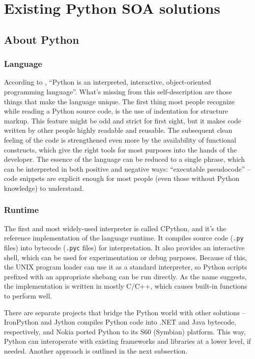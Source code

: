 \chapter{Existing Python SOA solutions}

\section{About Python}

\subsection{Language}

According to \cite{python-faq}, ``Python is an interpreted, interactive, object-oriented programming language''. What's missing from this self-description are those things that make the language unique. The first thing most people recognize while reading a Python source code, is the use of indentation for structure markup. This feature might be odd and strict for first sight, but it makes code written by other people highly readable and reusable. The subsequent clean feeling of the code is strengthened even more by the availability of functional constructs, which give the right tools for most purposes into the hands of the developer. The essence of the language can be reduced to a single phrase, which can be interpreted in both positive and negative ways: ``executable pseudocode'' -- code snippets are explicit enough for most people (even those without Python knowledge) to understand.

\subsection{Runtime}

The first and most widely-used interpreter is called CPython, and it's the reference implementation of the language runtime. It compiles source code (\verb|.py| files) into bytecode (\verb|.pyc| files) for interpretation. It also provides an interactive shell, which can be used for experimentation or debug purposes. Because of this, the UNIX program loader can use it as a standard interpreter, so Python scripts prefixed with an appropriate shebang can be run directly. As the name suggests, the implementation is written in mostly C/C++, which causes built-in functions to perform well.

There are separate projects that bridge the Python world with other solutions -- IronPython and Jython compiles Python code into .NET and Java bytecode, respectively, and Nokia ported Python to its S60 (Symbian) platform. This way, Python can interoperate with existing frameworks and libraries at a lower level, if needed. Another approach is outlined in the next subsection.

